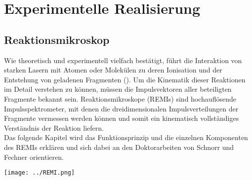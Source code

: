 \chapter{Experimentelle Realisierung} 
%
%
%
%
\section{Reaktionsmikroskop}



Wie theoretisch und experimentell vielfach bestätigt, führt die Interaktion von starken Lasern mit Atomen oder Molekülen zu deren Ionisation und der Entstehung von geladenen Fragmenten (\cite{hertel2011}). Um die Kinematik dieser Reaktionen im Detail verstehen zu können, müssen die Impulsvektoren aller beteiligten Fragmente bekannt sein. Reaktionsmikroskope (REMIs) sind hochauflösende Impulsspektrometer, mit denen die dreidimensionalen Impulsverteilungen der Fragmente vermessen werden können und somit ein kinematisch vollständiges Verständnis der Reaktion liefern. \\
Das folgende Kapitel wird das Funktionsprinzip und die einzelnen Komponenten des REMIs erklären und sich dabei an den Doktorarbeiten von Schnorr \cite{Schn14} und Fechner \cite{Fech14} orientieren. %
\begin{center}
\begin{minipage}{\linewidth}
\centering
\texttt{[image: ../REMI.png]}%
 \label{fig:REMI} 
\end{minipage} 
\end{center} 

